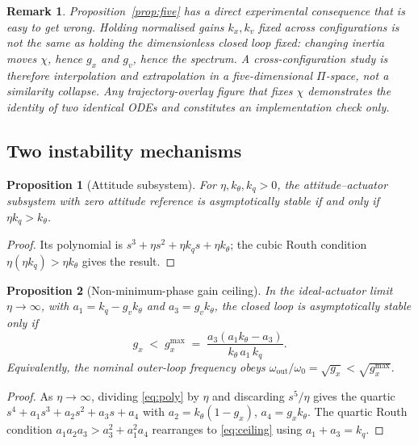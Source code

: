 \documentclass[11pt,a4paper]{article}
\newtheorem{proposition}{Proposition}
\newtheorem{remark}{Remark}
\begin{document}
\begin{remark}
Proposition~\ref{prop:five} has a direct experimental consequence that is easy to get wrong. Holding
\emph{normalised gains} $k_x,k_v$ fixed across configurations is not the same as holding the
\emph{dimensionless closed loop} fixed: changing inertia moves $\chi$, hence $g_x$ and $g_v$, hence
the spectrum. A cross-configuration study is therefore interpolation and extrapolation in a
five-dimensional $\Pi$-space, not a similarity collapse. Any trajectory-overlay figure that fixes
$\chi$ demonstrates the identity of two identical ODEs and constitutes an implementation check only.
\end{remark}

\subsection{Two instability mechanisms}

\begin{proposition}[Attitude subsystem]\label{prop:att}
For $\eta,k_\theta,k_q>0$, the attitude--actuator subsystem with zero attitude reference is
asymptotically stable if and only if $\eta k_q>k_\theta$.
\end{proposition}
\begin{proof}
Its polynomial is $s^3+\eta s^2+\eta k_q s+\eta k_\theta$; the cubic Routh condition
$\eta(\eta k_q)>\eta k_\theta$ gives the result.
\end{proof}

\begin{proposition}[Non-minimum-phase gain ceiling]\label{prop:ceiling}
In the ideal-actuator limit $\eta\to\infty$, with $a_1=k_q-g_vk_\theta$ and $a_3=g_vk_\theta$, the
closed loop is asymptotically stable only if
\begin{equation}\label{eq:ceiling}
g_x \;<\; g_x^{\max} \;=\; \frac{a_3(a_1k_\theta-a_3)}{k_\theta\,a_1\,k_q}.
\end{equation}
Equivalently, the nominal outer-loop frequency obeys
$\omega_{\text{out}}/\omega_0=\sqrt{g_x}<\sqrt{g_x^{\max}}$.
\end{proposition}
\begin{proof}
As $\eta\to\infty$, dividing \eqref{eq:poly} by $\eta$ and discarding $s^5/\eta$ gives the quartic
$s^4+a_1s^3+a_2s^2+a_3s+a_4$ with $a_2=k_\theta(1-g_x)$, $a_4=g_xk_\theta$. The quartic Routh
condition $a_1a_2a_3>a_3^2+a_1^2a_4$ rearranges to \eqref{eq:ceiling} using $a_1+a_3=k_q$.
\end{proof}
\end{document}
